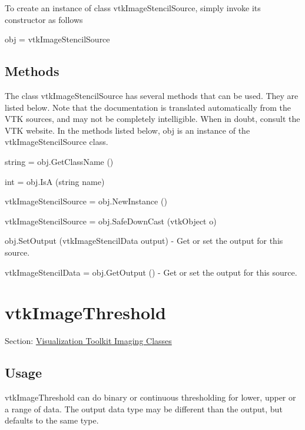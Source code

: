 To create an instance of class vtk\-Image\-Stencil\-Source, simply invoke its constructor as follows \begin{DoxyVerb}  obj = vtkImageStencilSource
\end{DoxyVerb}
 \hypertarget{vtkwidgets_vtkxyplotwidget_Methods}{}\subsection{Methods}\label{vtkwidgets_vtkxyplotwidget_Methods}
The class vtk\-Image\-Stencil\-Source has several methods that can be used. They are listed below. Note that the documentation is translated automatically from the V\-T\-K sources, and may not be completely intelligible. When in doubt, consult the V\-T\-K website. In the methods listed below, {\ttfamily obj} is an instance of the vtk\-Image\-Stencil\-Source class. 
\begin{DoxyItemize}
\item {\ttfamily string = obj.\-Get\-Class\-Name ()}  
\item {\ttfamily int = obj.\-Is\-A (string name)}  
\item {\ttfamily vtk\-Image\-Stencil\-Source = obj.\-New\-Instance ()}  
\item {\ttfamily vtk\-Image\-Stencil\-Source = obj.\-Safe\-Down\-Cast (vtk\-Object o)}  
\item {\ttfamily obj.\-Set\-Output (vtk\-Image\-Stencil\-Data output)} -\/ Get or set the output for this source.  
\item {\ttfamily vtk\-Image\-Stencil\-Data = obj.\-Get\-Output ()} -\/ Get or set the output for this source.  
\end{DoxyItemize}\hypertarget{vtkimaging_vtkimagethreshold}{}\section{vtk\-Image\-Threshold}\label{vtkimaging_vtkimagethreshold}
Section\-: \hyperlink{sec_vtkimaging}{Visualization Toolkit Imaging Classes} \hypertarget{vtkwidgets_vtkxyplotwidget_Usage}{}\subsection{Usage}\label{vtkwidgets_vtkxyplotwidget_Usage}
vtk\-Image\-Threshold can do binary or continuous thresholding for lower, upper or a range of data. The output data type may be different than the output, but defaults to the same type.

